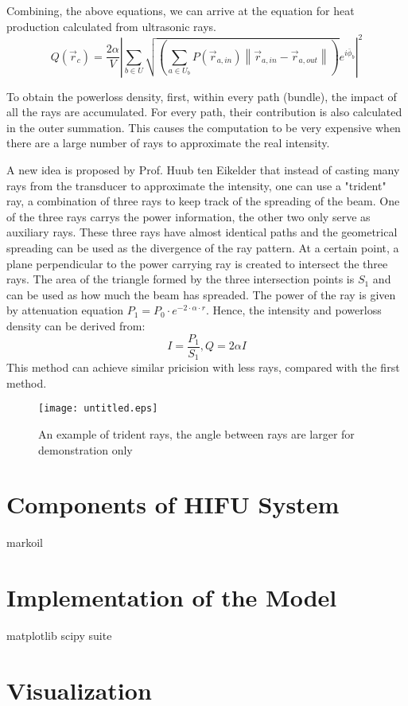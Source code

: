 Combining, the above equations, we can arrive at the equation for heat production calculated from ultrasonic rays.
$$Q(\vec{r}_c)=\frac{2\alpha}{V}\left|\sum_{b \in U}\sqrt{(\sum_{a \in U_b}P(\vec{r}_{a,in})\left\|\vec{r}_{a,in}-\vec{r}_{a,out}\right\|)} e^{i\bar{\phi}_b}\right|^2$$

To obtain the powerloss density, first, within every path (bundle), the impact of all the rays are accumulated. For every path, their contribution is also calculated in the outer summation. This causes the computation to be very expensive when there are a large number of rays to approximate the real intensity.

A new idea is proposed by Prof. Huub ten Eikelder that instead of casting many rays from the transducer to approximate the intensity, one can use a "trident" ray, a combination of three rays to keep track of the spreading of the beam. One of the three rays carrys the power information, the other two only serve as auxiliary rays. These three rays have almost identical paths and the geometrical spreading can be used as the divergence of the ray pattern. At a certain point, a plane perpendicular to the power carrying ray is created to intersect the three rays. The area of the triangle formed by the three intersection points is $S_1$ and can be used as how much the beam has spreaded. The power of the ray is given by attenuation equation $P_1=P_0\cdot e^{-2\cdot \alpha \cdot r}$. Hence, the intensity and powerloss density can be derived from:
$$I=\frac{P_1}{S_1}, Q=2\alpha I$$
This method can achieve similar pricision with less rays, compared with the first method.

\begin{figure}
    \centering
    \texttt{[image: untitled.eps]}
    \caption{An example of trident rays, the angle between rays are larger for demonstration only}
    \label{fig:Trident_ray}
\end{figure}

\section{Components of HIFU System}
markoil \cite{markoil}
\section{Implementation of the Model}
matplotlib\cite{matplotlib}
scipy suite\cite{scipy}

\section{Visualization}